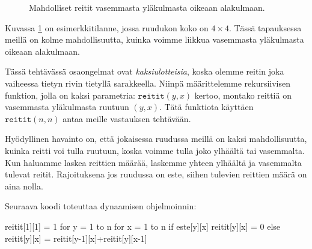 \begin{figure}
\center
{}
\caption{Mahdolliset reitit vasemmasta yläkulmasta oikeaan alakulmaan.}
\label{fig:reiruu}
\end{figure}

Kuvassa \ref{fig:reiruu} on esimerkkitilanne, jossa ruudukon koko on $4 \times 4$.
Tässä tapauksessa meillä on kolme mahdollisuutta, kuinka voimme liikkua
vasemmasta yläkulmasta oikeaan alakulmaan.

Tässä tehtävässä osaongelmat ovat \emph{kaksiulotteisia},
koska olemme reitin joka vaiheessa tietyn rivin tietyllä sarakkeella.
Niinpä määritte\-lemme rekursiivisen funktion, jolla on kaksi
parametria: $\texttt{reitit}(y,x)$ kertoo, montako reittiä on
vasemmasta yläkulmasta ruutuun $(y,x)$.
Tätä funktiota käyttäen $\texttt{reitit}(n,n)$ antaa meille
vastauksen tehtävään.

Hyödyllinen havainto on, että jokaisessa ruudussa meillä on kaksi
mahdollisuutta, kuinka reitti voi tulla ruutuun,
koska voimme tulla joko ylhäältä tai vasemmalta.
Kun haluamme laskea reittien määrää, laskemme yhteen ylhäältä
ja vasemmalta tulevat reitit.
Rajoituksena jos ruudussa on este, siihen tulevien reittien
määrä on aina nolla.

Seuraava koodi toteuttaa dynaamisen ohjelmoinnin:

\begin{code}
reitit[1][1] = 1
for y = 1 to n
    for x = 1 to n
        if este[y][x]
            reitit[y][x] = 0
        else
            reitit[y][x] = reitit[y-1][x]+reitit[y][x-1]
\end{code}

